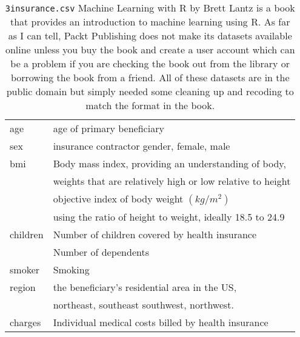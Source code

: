 \documentclass[12pt]{article}
\theoremstyle{remark}
\begin{document}
\begin{table}
	\caption{ \texttt{3insurance.csv}
Machine Learning with R by Brett Lantz is a book that provides an introduction to machine learning using R. As far as I can tell, Packt Publishing does not make its datasets available online unless you buy the book and create a user account which can be a problem if you are checking the book out from the library or borrowing the book from a friend. All of these datasets are in the public domain but simply needed some cleaning up and recoding to match the format in the book.}
	\label{Gasoline}
	\begin{tabular}{l|l}\hline
age & age of primary beneficiary  \\
sex & insurance contractor gender, female, male  \\
bmi & Body mass index, providing an understanding of body, \\
     & weights that are relatively  high or low relative to height  \\ & objective index of body weight $(kg / m ^ 2)$ \\ &  using   the ratio of height to weight, ideally 18.5 to 24.9 \\
children & Number of children covered by health insurance\\
&  Number of dependents \\
smoker & Smoking \\
region & the beneficiary's residential area in the US, \\
&  northeast, southeast southwest, northwest.\\
charges & Individual medical costs billed by health insurance \\
	\hline
	\end{tabular}
\end{table}
\end{document}

